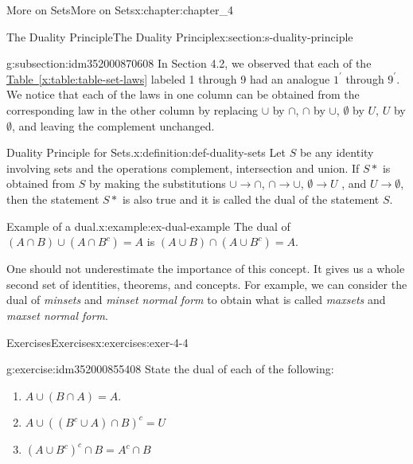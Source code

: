 \documentclass[oneside,10pt,]{book}
\newcommand{\xreffont}{\relax}
\begin{document}
\begin{chapterptx}{More on Sets}{}{More on Sets}{}{}{x:chapter:chapter_4}
\begin{sectionptx}{The Duality Principle}{}{The Duality Principle}{}{}{x:section:s-duality-principle}
%
%
\typeout{************************************************}
\typeout{************************************************}
%
\begin{subsectionptx}{}{}{}{}{}{g:subsection:idm352000870608}
In Section 4.2, we observed that each of the \hyperref[x:table:table-set-laws]{Table~{\xreffont\ref{x:table:table-set-laws}}} labeled 1 through 9 had an analogue \(1^{\prime}\) through \(9^{\prime}\). We notice that each of the laws in one column can be obtained from the corresponding law in the other column by replacing \(\cup\) by \(\cap \), \(\cap \) by \(\cup \), \(\emptyset \) by \(U\), \(U\) by \(\emptyset\), and leaving the complement unchanged.%
\begin{definition}{Duality Principle for Sets.}{x:definition:def-duality-sets}%
Let \(S\) be any identity involving sets and the operations complement, intersection and union. If \(S*\) is obtained from \(S\) by making the substitutions \(\cup  \to  \cap\), \(\cap \to \cup\), \(\emptyset \to U\) , and \(U\to \emptyset\), then the statement \(S*\) is also true and it is called the dual of the statement \(S\).%
\end{definition}
\begin{example}{Example of a dual.}{x:example:ex-dual-example}%
The dual of \((A \cap  B) \cup  \left(A \cap B^c \right) = A\) is \((A\cup B)\cap \left(A\cup B^c\right)=A\).%
\end{example}
One should not underestimate the importance of this concept. It gives us a whole second set of identities, theorems, and concepts. For example, we can consider the dual of \emph{minsets} and \emph{minset normal form} to obtain what is called \emph{maxsets} and \emph{maxset normal form}.%
\end{subsectionptx}
%
%
\typeout{************************************************}
\typeout{************************************************}
%
\begin{exercises-subsection}{Exercises}{}{Exercises}{}{}{x:exercises:exer-4-4}
\begin{divisionexercise}{1}{}{}{g:exercise:idm352000855408}%
State the dual of each of the following:%
\begin{enumerate}[label=(\alph*)]
\item{}\(A \cup  (B \cap  A) = A\).%
\item{}\(\displaystyle A \cup  \left(\left(B^c \cup  A\right) \cap B\right)^c = U\)%
\item{}\(\displaystyle \left(A \cup  B^c\right)^c \cap  B =A^c\cap B\)%

\end{enumerate}
\end{divisionexercise}
\end{exercises-subsection}
\end{sectionptx}
\end{chapterptx}
\end{document}
